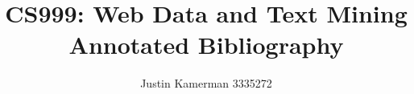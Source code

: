 \documentclass[12pt]{unbthesis}
\title{CS999: Web Data and Text Mining\\ Annotated Bibliography}
\author{Justin Kamerman 3335272}
\begin{document}
\maketitle
\nocite{*}



\end{document}
